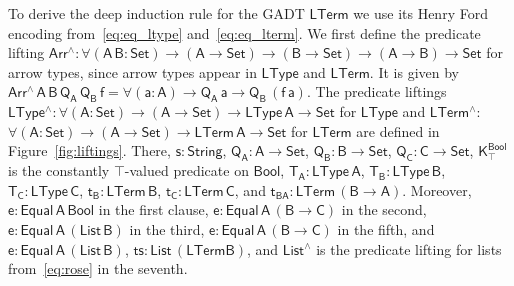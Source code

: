 \documentclass[9pt]{entcs}
\begin{document}
To derive the deep induction rule for the GADT $\mathsf{LTerm}$ we use
its Henry Ford encoding from~\eqref{eq:eq_ltype}
and~\eqref{eq:eq_lterm}. We first define the predicate lifting
$\mathsf{Arr^{\wedge} : \forall (A\, B : Set) \to (A \to Set) \to (B
  \to Set) \to (A \to B) \to Set}$ for arrow types, since arrow types
appear in $\mathsf{LType}$ and $\mathsf{LTerm}$.  It is given by
$\mathsf{Arr^{\wedge}\, A\, B\, Q_A\, Q_B\, f = \forall (a : A) \to
  Q_A\,a \to Q_B\, (f\,a)}$. The predicate liftings
$\mathsf{LType^{\wedge} : \forall (A : Set) \to (A \to Set) \to
  LType\,A \to Set}$ for $\mathsf{LType}$ and $\mathsf{LTerm^{\wedge}
  :}$ $\mathsf{\forall (A : Set) \to (A \to Set) \to LTerm\,A \to
  Set}$ for $\mathsf{LTerm}$ are defined in Figure~\ref{fig:liftings}.
There, $\mathsf{s : String}$, $\mathsf{Q_A : A \to Set}$, $\mathsf{Q_B
  : B \to Set}$, $\mathsf{Q_C : C \to Set}$,
$\mathsf{K^{Bool}_{\top}}$ is the constantly $\mathsf{\top}$-valued
predicate on $\mathsf{Bool}$, $\mathsf{T_A : LType\, A}$, $\mathsf{T_B
  : LType \,B}$, $\mathsf{T_C : LType \,C}$, $\mathsf{t_B : LTerm \,
  B}$, $\mathsf{t_C : LTerm \, C}$, and $\mathsf{t_{BA} : LTerm \, (B
  \to A)}$.  Moreover, $\mathsf{e : Equal\,A\,Bool}$ in the first
clause, $\mathsf{e : Equal\, A\, (B \to C)}$ in the second, $\mathsf{e
  : Equal\, A\, (List\, B)}$ in the third, $\mathsf{e : Equal \, A \,
  (B \to C)}$ in the fifth, and $\mathsf{e : Equal\, A\, (List \,B)}$,
$\mathsf{ts : List\, (LTerm B)}$, and $\mathsf{List^\wedge}$ is the
predicate lifting for lists from~\eqref{eq:rose} in the seventh.
\end{document}

